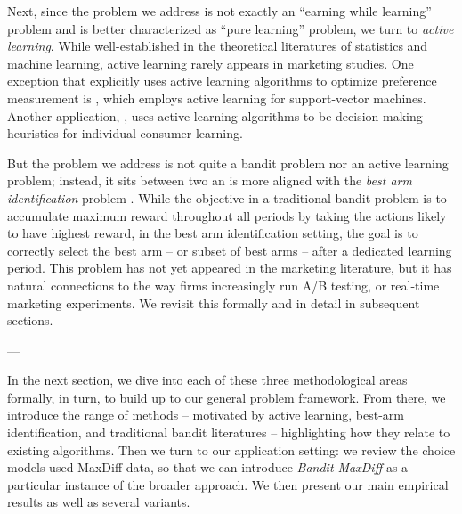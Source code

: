 \documentclass[nonblindrev]{informs3}
\begin{document}
Next, since the problem we address is not exactly an ``earning while learning'' problem and is better characterized as ``pure learning'' problem, we turn to \emph{active learning}. While well-established in the theoretical literatures of statistics and machine learning, active learning rarely appears in marketing studies. One exception that explicitly uses active learning algorithms to optimize preference measurement is \cite{huang2016consumer}, which employs active learning for support-vector machines. Another application, \cite{dzyabura2011activelearn}, uses active learning algorithms to be decision-making heuristics for individual consumer learning. 

But the problem we address is not quite a bandit problem nor an active learning problem; instead, it sits between two an is more aligned with the \emph{best arm identification} problem \citep{audibert2010best}. While the objective in a traditional bandit problem is to accumulate maximum reward throughout all periods by taking the actions likely to have highest reward, in the best arm identification setting, the goal is to correctly select the best arm -- or subset of best arms -- after a dedicated learning period. This problem has not yet appeared in the marketing literature, but it has natural connections to the way firms increasingly run A/B testing, or real-time marketing experiments. We revisit this formally and in detail in subsequent sections.

\begin{center}{---}\end{center}


In the next section, we dive into each of these three methodological areas formally, in turn, to build up to our general problem framework. From there, we introduce the range of methods -- motivated by active learning, best-arm identification, and traditional bandit literatures -- highlighting how they relate to existing algorithms. Then we turn to our application setting: we review the choice models used MaxDiff data, so that we can introduce \emph{Bandit MaxDiff} as a particular instance of the broader approach. We then present our main empirical results as well as several variants. 


\end{document}
